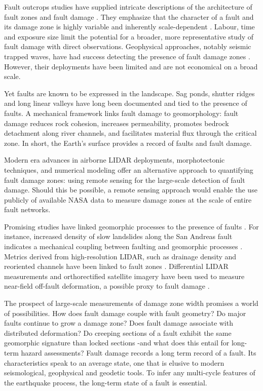 \documentclass[12pt, notitlepage]{report}
\begin{document}
Fault outcrops studies have supplied intricate descriptions of the architecture of fault zones and fault damage \cite{chester1987composite, chester1986implications, chester1993internal, shipton2001damage, Faulkner2008OnFaults}. They emphasize that the character of a fault and its damage zone is highly variable and inherently scale-dependent \cite{shipton2006thick}. Labour, time and exposure size limit the potential for a broader, more representative study of fault damage with direct observations. Geophysical approaches, notably seismic trapped waves, have had success detecting the presence of fault damage zones \cite{Ben-Zion1998PropertiesStructures, Share2017InternalArray}. However, their deployments have been limited and are not economical on a broad scale. 

Yet faults are known to be expressed in the landscape. Sag ponds, shutter ridges and long linear valleys have long been documented and tied to the presence of faults. A mechanical framework links fault damage to geomorphology: fault damage reduces rock cohesion, increases permeability, promotes bedrock detachment along river channels, and facilitates material flux through the critical zone. In short, the Earth's surface provides a record of faults and fault damage.

Modern era advances in airborne LIDAR deployments, morphotectonic techniques, and numerical modeling offer an alternative approach to quantifying fault damage zones: using remote sensing for the large-scale detection of fault damage. Should this be possible, a remote sensing approach would enable the use publicly of available NASA data to measure damage zones at the scale of entire fault networks. 

Promising studies have linked geomorphic processes to the presence of faults \cite{Wechsler2009, Zielke2015FaultData}. For instance, increased density of slow landslides along the San Andreas fault indicates a mechanical coupling between faulting and geomorphic processes \cite{DeLong2012MultitemporalEarthflow}. Metrics derived from high-resolution LIDAR,  such as drainage density and reoriented channels have been linked to fault zones \cite{Zielke2015FaultData,Roy2016}. Differential LIDAR measurements and orthorectified satellite imagery have been used to measure near-field off-fault deformation, a possible proxy to fault damage \cite{Milliner2015QuantifyingEarthquake, Nissen2014CoseismicEarthquakes, Scott2018TheTopography}.

The prospect of large-scale measurements of damage zone width promises a world of possibilities. How does fault damage couple with fault geometry? Do major faults continue to grow a damage zone? Does fault damage associate with distributed deformation? Do creeping sections of a fault exhibit the same geomorphic signature than locked sections -and what does this entail for long-term hazard assessments? Fault damage records a long term record of a fault. Its characteristics speak to an average state, one that is elusive to modern seismological, geophysical and geodetic tools. To infer any multi-cycle features of the earthquake process, the long-term state of a fault is essential.
\end{document}
